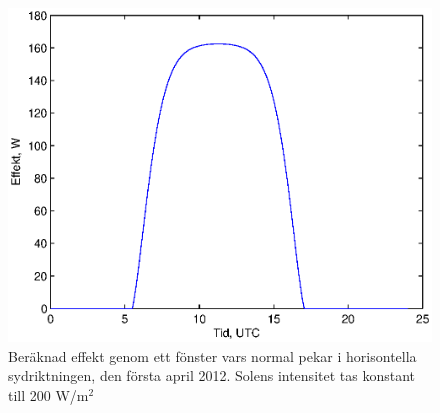 \begin{figure}[hpbt]
\centering
\includegraphics[scale=1]{images/effekt120401.eps}
\caption{\label{fig:effekt120401} Beräknad effekt genom ett fönster vars normal pekar i horisontella sydriktningen, den första april 2012. Solens intensitet tas konstant till 200 W/m$^2$}
\end{figure}
